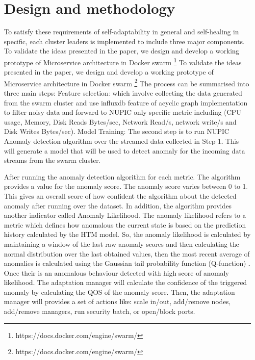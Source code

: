 \documentclass[sigconf]{acmart}
\begin{document}
\section{Design and methodology}
\label{sec:modelling}




To satisfy these requirements of self-adaptability in general and self-healing in specific, each cluster leaders is implemented to include three major components. To validate the ideas presented in the paper, we design and develop a working prototype of Microservice architecture in Docker swarm \footnote{https://docs.docker.com/engine/swarm/} 
To validate the ideas presented in the paper, we design and develop a working prototype of Microservice architecture in Docker swarm \footnote{https://docs.docker.com/engine/swarm/} 
The process can be summarised into three main steps: 
Feature selection: which involve collecting the data generated from the swarm cluster and use influxdb feature of acyclic graph implementation to filter noisy data and forward to NUPIC only specific metric including (CPU usage, Memory, Disk Reads Bytes/sec, Network Read/s, network write/s and Disk Writes Bytes/sec). 
Model Training: The second step is to run NUPIC Anomaly detection algorithm over the streamed data collected in Step 1. This will generate a model that will be used to detect anomaly for the incoming data streams from the swarm cluster. 

After running the anomaly detection algorithm for each metric. The algorithm provides a value for the anomaly score. The anomaly score varies between 0 to 1. This gives an overall score of how confident the algorithm about the detected anomaly after running over the dataset. In addition, the algorithm provides another indicator called Anomaly Likelihood. The anomaly likelihood refers to a metric which defines how anomalous the current state is based on the prediction history calculated by the HTM model. So, the anomaly likelihood is calculated by maintaining a window of the last raw anomaly scores and then calculating the normal distribution over the last obtained values, then the most recent average of anomalies is calculated using the Gaussian tail probability function (Q-function) \cite{craig1991new}. Once their is an anomalous behaviour detected with high score of anomaly likelihood. The adaptation manager will calculate the confidence of the triggered anomaly by calculating the QOS of the anomaly score. Then, the adaptation manager will provides a set of actions like: scale in/out, add/remove nodes, add/remove managers, run security batch, or open/block ports.  
\end{document}
